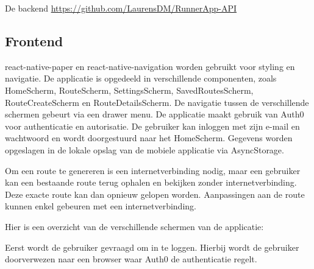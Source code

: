     De backend \url{https://github.com/LaurensDM/RunnerApp-API}

    \subsection{Frontend}

    react-native-paper en react-native-navigation worden gebruikt voor styling en navigatie. 
    De applicatie is opgedeeld in verschillende componenten, 
    zoals HomeScherm, RouteScherm, SettingsScherm, SavedRoutesScherm, RouteCreateScherm en RouteDetailsScherm. 
    De navigatie tussen de verschillende schermen gebeurt via een drawer menu. 
    De applicatie maakt gebruik van Auth0 voor authenticatie en autorisatie. 
    De gebruiker kan inloggen met zijn e-mail en wachtwoord en wordt doorgestuurd naar het HomeScherm. 
    Gegevens worden opgeslagen in de lokale opslag van de mobiele applicatie via AsyncStorage.

    \vspace{1cm}


    Om een route te genereren is een internetverbinding nodig, 
    maar een gebruiker kan een bestaande route terug ophalen en bekijken zonder internetverbinding. Deze exacte route kan dan opnieuw gelopen worden. Aanpassingen aan de route kunnen enkel gebeuren met een internetverbinding.

    \vspace{1cm}

    
    Hier is een overzicht van de verschillende schermen van de applicatie:

    \vspace{1cm}

    
    Eerst wordt de gebruiker gevraagd om in te loggen. Hierbij wordt de gebruiker doorverwezen naar een browser waar Auth0 de authenticatie regelt.

